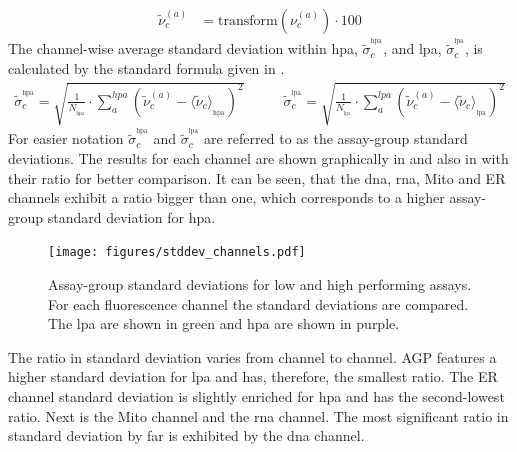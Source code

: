 \begin{align}\label{eq:channelsnormalized}
\widetilde{\nu}_c^{(a)} & = \text{transform}(\nu_c^{(a)})\cdot100
\end{align}
The channel-wise average standard deviation within \acl{hpa}, $\widetilde{\sigma}_c^{^\text{hpa}}$, and \acl{lpa}, $\widetilde{\sigma}_c^{^\text{lpa}}$, is calculated by the standard formula given in .
\begin{align}\label{eq:channelsstd}
\widetilde{\sigma}_c^{^\text{hpa}}  = \sqrt{\frac{1}{N_{_\text{hpa}}}\cdot \sum_{a}^{hpa}\left(\widetilde{\nu}_c^{(a)}-\langle\widetilde{\nu}_c\rangle_{_\text{hpa}}\right)^2} \qquad & \widetilde{\sigma}_c^{^\text{lpa}}  = \sqrt{\frac{1}{N_{_\text{lpa}}}\cdot \sum_{a}^{lpa}\left(\widetilde{\nu}_c^{(a)}-\langle\widetilde{\nu}_c\rangle_{_\text{lpa}}\right)^2}
\end{align}
For easier notation $\widetilde{\sigma}_c^{^\text{hpa}}$ and $\widetilde{\sigma}_c^{^\text{lpa}}$ are referred to as the assay-group standard deviations. The results for each channel are shown graphically in  and also in  with their ratio for better comparison. It can be seen, that the \ac{dna}, \ac{rna}, Mito and ER channels exhibit a ratio bigger than one, which corresponds to a higher assay-group standard deviation for \acl{hpa}.
\begin{figure}[H]
	\centering
	\texttt{[image: figures/stddev\_channels.pdf]}
	\caption[Assay-Group Standard Deviations of Low and High Performing Assays]{Assay-group standard deviations for low and high performing assays. For each fluorescence channel the standard deviations are compared. The \acl{lpa} are shown in green and \acl{hpa} are shown in purple.}
	\label{fig:channelstd}
\end{figure}
The ratio in standard deviation varies from channel to channel. AGP features a higher standard deviation for \acl{lpa} and has, therefore, the smallest ratio. The ER channel standard deviation is slightly enriched for \acl{hpa} and has the second-lowest ratio. Next is the Mito channel and the \ac{rna} channel. The most significant ratio in standard deviation by far is exhibited by the \ac{dna} channel. 
